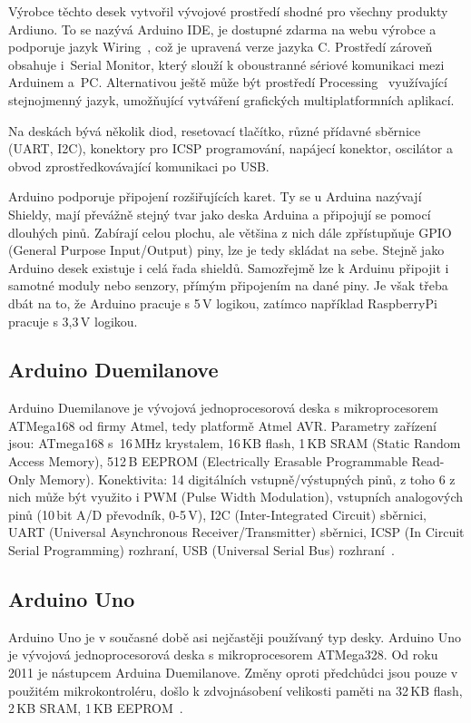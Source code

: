 Výrobce těchto desek vytvořil vývojové prostředí shodné pro všechny produkty Ardiuno. To se nazývá Arduino IDE, je dostupné zdarma na webu výrobce a podporuje jazyk Wiring~\cite{embed_about_wiring_2011}, což je upravená verze jazyka C. Prostředí zároveň obsahuje i~Serial Monitor, který slouží k oboustranné sériové komunikaci mezi Arduinem a~PC. Alternativou ještě může být prostředí Processing~\cite{embed_about_processing_2015} využívající stejnojmenný jazyk, umožňující vytváření grafických multiplatformních aplikací.
	
Na deskách bývá několik diod, resetovací tlačítko, různé přídavné sběrnice (UART, I2C), konektory pro ICSP programování, napájecí konektor, oscilátor a obvod zprostředkovávající komunikaci po USB.
	
Arduino podporuje připojení rozšiřujících karet. Ty se u Arduina nazývají Shieldy, mají převážně stejný tvar jako deska Arduina a připojují se pomocí dlouhých pinů. Zabírají celou plochu, ale většina z nich dále zpřístupňuje GPIO (General Purpose Input/Output) piny, lze je tedy skládat na sebe. Stejně jako Arduino desek existuje i celá řada shieldů. Samozřejmě lze k Arduinu připojit i samotné moduly nebo senzory, přímým připojením na dané piny. Je však třeba dbát na to, že Arduino pracuje s 5\,V logikou, zatímco například RaspberryPi pracuje s 3,3\,V logikou.
	
		\subsection{Arduino Duemilanove} Arduino Duemilanove je vývojová jednoprocesorová deska s mikroprocesorem ATMega168 od firmy Atmel, tedy platformě Atmel AVR. 
		Parametry zařízení jsou: ATmega168 s~16\,MHz krystalem, 16\,KB flash, 1\,KB SRAM (Static Random Access Memory), 512\,B EEPROM (Electrically Erasable Programmable Read-Only Memory). 	Konektivita: 14 digitálních vstupně/výstupných pinů, z toho 6 z nich může být využito i PWM (Pulse Width Modulation), vstupních analogových pinů (10\,bit A/D převodník, 0-5\,V), I2C (Inter-Integrated Circuit) sběrnici, UART (Universal Asynchronous Receiver/Transmitter) sběrnici, ICSP (In Circuit Serial Programming) rozhraní, USB (Universal Serial Bus) rozhraní~\cite{ArduinoDuemilanove}.	
	
		\subsection{Arduino Uno} Arduino Uno je v současné době asi nejčastěji používaný typ desky. Arduino Uno je vývojová jednoprocesorová deska s mikroprocesorem ATMega328. Od roku 2011 je nástupcem Arduina Duemilanove. Změny oproti předchůdci jsou pouze v použitém mikrokontroléru, došlo k zdvojnásobení velikosti paměti na 32\,KB flash, 2\,KB SRAM, 1\,KB EEPROM~\cite{ArduinoUno}.
	
